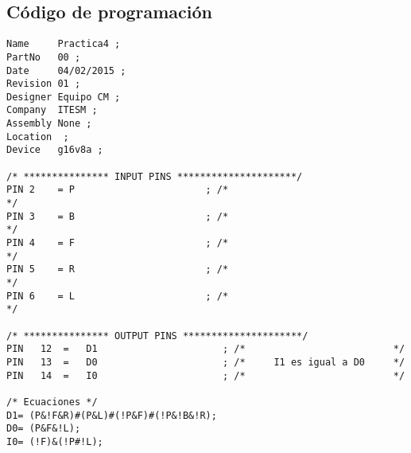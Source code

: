 \subsection{C\'odigo de programaci\'on}

\begin{lstlisting}
Name     Practica4 ;
PartNo   00 ;
Date     04/02/2015 ;
Revision 01 ;
Designer Equipo CM ;
Company  ITESM ;
Assembly None ;
Location  ; 
Device   g16v8a ;

/* *************** INPUT PINS *********************/
PIN 2    = P                       ; /*                                 */ 
PIN 3    = B                       ; /*                                 */ 
PIN 4    = F                       ; /*                                 */ 
PIN 5    = R                       ; /*                                 */ 
PIN 6    = L                       ; /*                                 */ 

/* *************** OUTPUT PINS *********************/
PIN   12  =   D1                      ; /*                          */ 
PIN   13  =   D0                      ; /*     I1 es igual a D0     */ 
PIN   14  =   I0                      ; /*                          */ 

/* Ecuaciones */
D1= (P&!F&R)#(P&L)#(!P&F)#(!P&!B&!R);
D0= (P&F&!L);
I0= (!F)&(!P#!L);
\end{lstlisting}